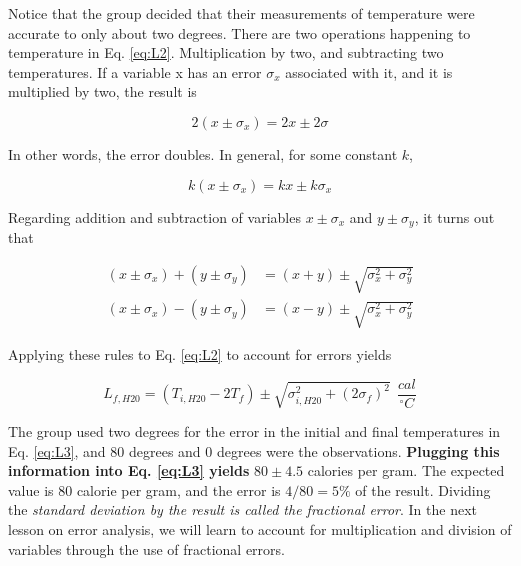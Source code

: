 \documentclass[12pt]{article}
\begin{document}
Notice that the group decided that their measurements of temperature were accurate to only about two degrees.  There are two operations happening to temperature in Eq. \ref{eq:L2}.  Multiplication by two, and subtracting two temperatures.  If a variable x has an error $\sigma_x$ associated with it, and it is multiplied by two, the result is

\begin{equation}
2(x\pm \sigma_x) = 2x \pm 2\sigma
\end{equation}

In other words, the error doubles.  In general, for some constant $k$,

\begin{equation}
k(x\pm \sigma_x) = kx \pm k\sigma_x
\end{equation}

Regarding addition and subtraction of variables $x\pm \sigma_x$ and $y\pm \sigma_y$, it turns out that

\begin{align}
(x\pm \sigma_x) + (y\pm \sigma_y) &= (x+y) \pm \sqrt{\sigma_x^2 + \sigma_y^2} \\
(x\pm \sigma_x) - (y\pm \sigma_y) &= (x-y) \pm \sqrt{\sigma_x^2 + \sigma_y^2}
\end{align}

Applying these rules to Eq. \ref{eq:L2} to account for errors yields

\begin{equation}
L_{f,H20} = \left( T_{i,H20} - 2T_f\right) \pm \sqrt{\sigma_{i,H20}^2 + (2\sigma_f)^2}~~\frac{cal}{^{\circ}C} \label{eq:L3}
\end{equation}

The group used two degrees for the error in the initial and final temperatures in Eq. \ref{eq:L3}, and 80 degrees and 0 degrees were the observations.  \textbf{Plugging this information into Eq. \ref{eq:L3} yields} $80 \pm 4.5$ calories per gram.  The expected value is 80 calorie per gram, and the error is $4/80 = 5\%$ of the result.  Dividing the \textit{standard deviation by the result is called the fractional error}.  In the next lesson on error analysis, we will learn to account for multiplication and division of variables through the use of fractional errors.
\end{document}
